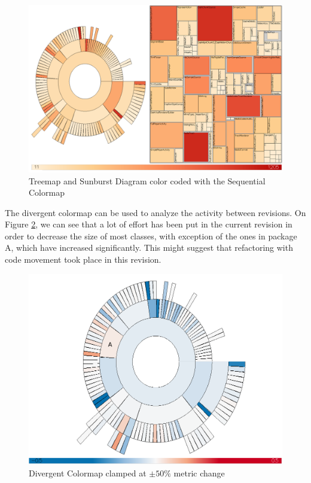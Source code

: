 \begin{figure}[H]
  \centering
  \includegraphics[width=1\textwidth]{figures/colormap_hier.png}
  \caption{Treemap and Sunburst Diagram color coded with the Sequential Colormap}
  \label{fig:colormap_hier}
\end{figure}

The divergent colormap can be used to analyze the activity between revisions. On Figure \ref{fig:colormap_div_sun}, we can see that a lot of effort has been put in the current revision in order to decrease the size of most classes, with exception of the ones in package A, which have increased significantly. This might suggest that refactoring with code movement took place in this revision.

\begin{figure}[H]
  \centering
  \includegraphics[width=1.0\textwidth]{figures/colormap_div_sun.png}
  \caption{Divergent Colormap clamped at $\pm50\%$ metric change}
  \label{fig:colormap_div_sun}
\end{figure}

